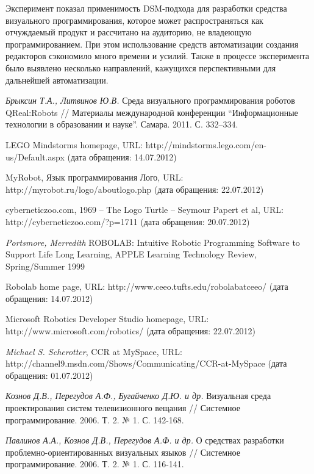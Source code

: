 \documentclass[a4paper]{article}
\begin{document}
Эксперимент показал применимость DSM-подхода для разработки средства визуального программирования, которое может распространяться как отчуждаемый продукт и рассчитано на аудиторию, не владеющую программированием. При этом использование средств автоматизации создания редакторов сэкономило много времени и усилий. Также в процессе эксперимента было выявлено несколько направлений, кажущихся перспективными для дальнейшей автоматизации.

\begin{thebibliography}{9001}

   \emph{Брыксин Т.А., Литвинов Ю.В.} Среда визуального программирования роботов QReal:Robots // Материалы международной конференции ``Информационные технологии в образовании и науке''. Самара. 2011. С. 332--334.
  
   LEGO Mindstorms homepage, URL: http://mindstorms.lego.com/en-us/Default.aspx (дата обращения: 14.07.2012)
  
   MyRobot, Язык программирования Лого, URL: http://myrobot.ru/logo/aboutlogo.php (дата обращения: 22.07.2012)
  
   cyberneticzoo.com, 1969 – The Logo Turtle – Seymour Papert et al, URL: http://cyberneticzoo.com/?p=1711 (дата обращения: 20.07.2012)
  
   \emph{Portsmore, Merredith} ROBOLAB: Intuitive Robotic Programming Software to Support Life Long Learning, APPLE Learning Technology Review, Spring/Summer 1999
  
   Robolab home page, URL: http://www.ceeo.tufts.edu/robolabatceeo/ (дата обращения: 14.07.2012)
  
   Microsoft Robotics Developer Studio homepage, URL: http://www.microsoft.com/robotics/ (дата обращения: 22.07.2012)
  
   \emph{Michael S. Scherotter}, CCR at MySpace, URL: http://channel9.msdn.com/Shows/Communicating/CCR-at-MySpace (дата обращения: 01.07.2012)
  
   \emph{Кознов Д.В., Перегудов А.Ф., Бугайченко Д.Ю. и др.} Визуальная среда проектирования систем телевизионного вещания // Системное программирование. 2006. Т. 2. № 1. С. 142-168.
  
   \emph{Павлинов А.А., Кознов Д.В., Перегудов А.Ф. и др.} О средствах разработки проблемно-ориентированных визуальных языков // Системное программирование. 2006. Т. 2. № 1. С. 116-141.
  

\end{thebibliography}
\end{document}

